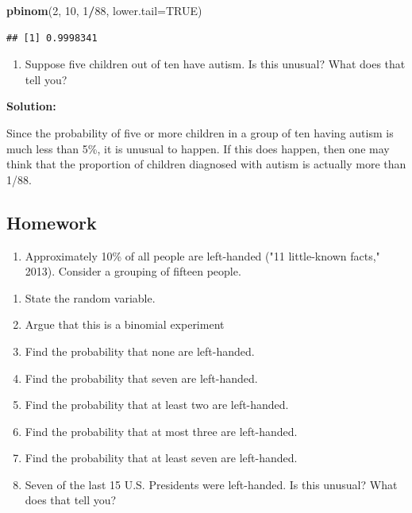 \documentclass[]{book}
\newenvironment{Shaded}{\begin{snugshade}}{\end{snugshade}}
\newcommand{\DataTypeTok}[1]{\textcolor[rgb]{0.13,0.29,0.53}{#1}}
\newcommand{\DecValTok}[1]{\textcolor[rgb]{0.00,0.00,0.81}{#1}}
\newcommand{\KeywordTok}[1]{\textcolor[rgb]{0.13,0.29,0.53}{\textbf{#1}}}
\newcommand{\NormalTok}[1]{#1}
\newcommand{\OperatorTok}[1]{\textcolor[rgb]{0.81,0.36,0.00}{\textbf{#1}}}
\newcommand{\OtherTok}[1]{\textcolor[rgb]{0.56,0.35,0.01}{#1}}
\providecommand{\tightlist}{%
  \setlength{\itemsep}{0pt}\setlength{\parskip}{0pt}}
\begin{document}
\begin{Shaded}
\begin{Highlighting}[]
\KeywordTok{pbinom}\NormalTok{(}\DecValTok{2}\NormalTok{, }\DecValTok{10}\NormalTok{, }\DecValTok{1}\OperatorTok{/}\DecValTok{88}\NormalTok{, }\DataTypeTok{lower.tail=}\OtherTok{TRUE}\NormalTok{)}
\end{Highlighting}
\end{Shaded}

\begin{verbatim}
## [1] 0.9998341
\end{verbatim}

\begin{enumerate}
\def\labelenumi{\alph{enumi}.}
\setcounter{enumi}{6}
\tightlist
\item
  Suppose five children out of ten have autism. Is this unusual? What does that tell you?
\end{enumerate}

\textbf{Solution:}

Since the probability of five or more children in a group of ten having autism is much less than 5\%, it is unusual to happen. If this does happen, then one may think that the proportion of children diagnosed with autism is actually more than 1/88.

\hypertarget{homework-15}{%
\subsection{Homework}\label{homework-15}}

\begin{enumerate}
\def\labelenumi{\arabic{enumi}.}
\tightlist
\item
  Approximately 10\% of all people are left-handed ("11 little-known facts," 2013). Consider a grouping of fifteen people.
\end{enumerate}

\begin{enumerate}
\def\labelenumi{\alph{enumi}.}
\tightlist
\item
  State the random variable.
\item
  Argue that this is a binomial experiment
\item
  Find the probability that none are left-handed.
\item
  Find the probability that seven are left-handed.
\item
  Find the probability that at least two are left-handed.
\item
  Find the probability that at most three are left-handed.
\item
  Find the probability that at least seven are left-handed.
\item
  Seven of the last 15 U.S. Presidents were left-handed. Is this
  unusual? What does that tell you?
\end{enumerate}
\end{document}
